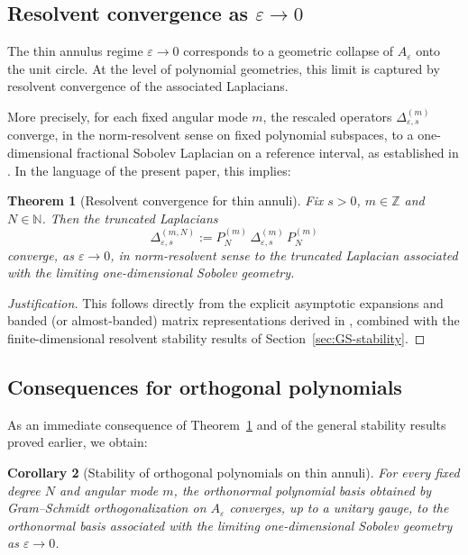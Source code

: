 \documentclass{amsart}
\numberwithin{equation}{section}
\newtheorem{theorem}{Theorem}[section]
\newtheorem{corollary}[theorem]{Corollary}
\theoremstyle{definition}
\theoremstyle{remark}
\begin{document}
\subsection{Resolvent convergence as $\varepsilon\to 0$}

The thin annulus regime $\varepsilon\to 0$ corresponds to a geometric collapse of $A_\varepsilon$
onto the unit circle.
At the level of polynomial geometries, this limit is captured by resolvent convergence of
the associated Laplacians.

More precisely, for each fixed angular mode $m$, the rescaled operators
$\Delta_{\varepsilon,s}^{(m)}$ converge, in the norm-resolvent sense on fixed polynomial
subspaces, to a one-dimensional fractional Sobolev Laplacian on a reference interval,
as established in \cite{MagnotThinAnnuli}.
In the language of the present paper, this implies:

\begin{theorem}[Resolvent convergence for thin annuli]
\label{thm:thin-annulus-resolvent}
Fix $s>0$, $m\in\mathbb Z$ and $N\in\mathbb N$.
Then the truncated Laplacians
\[
\Delta_{\varepsilon,s}^{(m,N)}:=P_N^{(m)}\,\Delta_{\varepsilon,s}^{(m)}\,P_N^{(m)}
\]
converge, as $\varepsilon\to 0$, in norm-resolvent sense to the truncated Laplacian
associated with the limiting one-dimensional Sobolev geometry.
\end{theorem}

\begin{proof}[Justification]
This follows directly from the explicit asymptotic expansions and banded (or almost-banded)
matrix representations derived in \cite{MagnotThinAnnuli}, combined with the finite-dimensional
resolvent stability results of Section~\ref{sec:GS-stability}.
\end{proof}

\subsection{Consequences for orthogonal polynomials}

As an immediate consequence of Theorem~\ref{thm:thin-annulus-resolvent} and of the general
stability results proved earlier, we obtain:

\begin{corollary}[Stability of orthogonal polynomials on thin annuli]
\label{cor:thin-annulus-polynomials}
For every fixed degree $N$ and angular mode $m$, the orthonormal polynomial basis obtained
by Gram--Schmidt orthogonalization on $A_\varepsilon$ converges, up to a unitary gauge,
to the orthonormal basis associated with the limiting one-dimensional Sobolev geometry
as $\varepsilon\to 0$.
\end{corollary}
\end{document}
